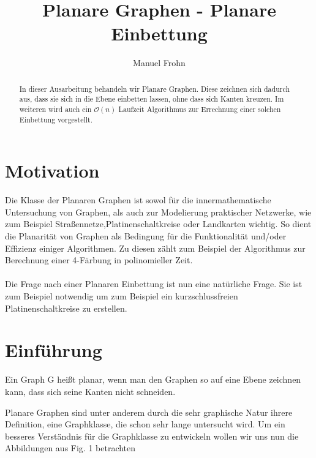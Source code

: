\documentclass[runningheads]{llncs}
\begin{document}
\title{Planare Graphen - Planare Einbettung}
\author{Manuel Frohn}

\maketitle

\begin{abstract}
In dieser Ausarbeitung behandeln wir Planare Graphen. Diese zeichnen sich dadurch aus, dass sie sich in die Ebene einbetten lassen,
ohne dass sich Kanten kreuzen. Im weiteren wird auch ein $\mathcal{O}(n)$ Laufzeit Algorithmus zur Errechnung einer solchen Einbettung vorgestellt.
\end{abstract}

\newpage

\section{Motivation}
Die Klasse der Planaren Graphen ist sowol für die innermathematische Untersuchung von Graphen, als auch zur Modelierung
praktischer Netzwerke, wie zum Beispiel Straßennetze,Platinenschaltkreise oder Landkarten wichtig. So dient die Planarität von Graphen als 
Bedingung für die Funktionalität und/oder Effizienz einiger Algorithmen. Zu diesen zählt zum Beispiel der Algorithmus zur 
Berechnung einer  4-Färbung in polinomieller Zeit.
\\
\\
Die Frage nach einer Planaren Einbettung ist nun eine natürliche Frage. Sie ist zum Beispiel notwendig um zum Beispiel ein kurzschlussfreien Platinenschaltkreise zu erstellen.

\section{Einführung}
\begin{definition}[Planarität]
    Ein Graph G heißt planar, wenn man den Graphen so auf eine Ebene zeichnen kann, dass sich seine 
    Kanten nicht schneiden.
\end{definition}
Planare Graphen sind unter anderem durch die sehr graphische Natur ihrere Definition, eine Graphklasse, die schon sehr
lange untersucht wird. Um ein besseres Verständnis für die Graphklasse zu entwickeln wollen wir uns nun die Abbildungen
aus Fig. 1 betrachten
\end{document}
